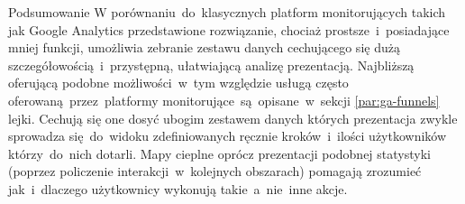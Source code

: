 \begin{chapter}{Podsumowanie}
	W porównaniu~do~klasycznych platform monitorujących takich jak Google Analytics przedstawione rozwiązanie, chociaż prostsze~i~posiadające mniej funkcji, umożliwia zebranie zestawu danych cechującego się dużą szczegółowością~i~przystępną, ułatwiającą analizę prezentacją. Najbliższą oferującą podobne możliwości~w~tym względzie usługą często oferowaną~przez~platformy monitorujące~są~opisane~w~sekcji \ref{par:ga-funnels} lejki. Cechują się one dosyć  ubogim zestawem danych których prezentacja zwykle sprowadza się~do~widoku zdefiniowanych ręcznie kroków~i~ilości użytkowników którzy~do~nich dotarli. Mapy cieplne oprócz prezentacji podobnej statystyki (poprzez policzenie interakcji~w~kolejnych obszarach) pomagają zrozumieć jak~i~dlaczego użytkownicy wykonują takie~a~nie~inne akcje.
	
\end{chapter}

